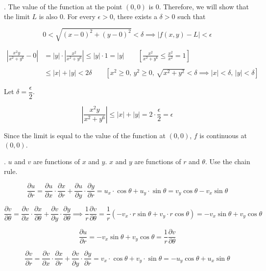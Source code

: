 \documentclass{article}
\begin{document}
\hfill

. The value of the function at the point $(0,0)$ is $0$. Therefore, we will show that the limit $L$ is also $0$. For every $\epsilon>0$, there exists a $\delta>0$ such that

\[0<\sqrt{(x-0)^2+(y-0)^2}<\delta\implies\left|f(x,y)-L\right|<\epsilon\]

\begin{align*}\left|\frac{x^2y}{x^2+y^6}-0\right|&=|y|\cdot\left|\frac{x^2}{x^2+y^6}\right|\leq|y|\cdot1=|y|\qquad\left[\frac{x^2}{x^2+y^6}\leq\frac{x^2}{x^2}=1\right]\\\\&\leq|x|+|y|<2\delta\qquad\left[x^2\geq0,\,y^2\geq0,\,\sqrt{x^2+y^2}<\delta\implies|x|<\delta,\,|y|<\delta\right]\end{align*}

\hfill

\noindent Let $\delta=\dfrac\epsilon2$.

\[\left|\frac{x^2y}{x^2+y^6}\right|\leq|x|+|y|=2\cdot\frac\epsilon2=\epsilon\]

\hfill

\noindent Since the limit is equal to the value of the function at $(0,0)$, $f$ is continuous at $(0,0)$.

\hfill

. $u$ and $v$ are functions of $x$ and $y$. $x$ and $y$ are functions of $r$ and $\theta$. Use the chain rule.

\[\frac{\partial u}{\partial r}=\frac{\partial u}{\partial x}\cdot\frac{\partial x}{\partial r}+\frac{\partial u}{\partial y}\cdot\frac{\partial y}{\partial r}=u_x\cdot\cos\theta+u_y\cdot\sin\theta=v_y\cos\theta-v_x\sin\theta\]

\[\frac{\partial v}{\partial\theta}=\frac{\partial v}{\partial x}\cdot\frac{\partial x}{\partial\theta}+\frac{\partial v}{\partial y}\cdot\frac{\partial y}{\partial\theta}\implies\frac1r\frac{\partial v}{\partial\theta}=\frac1r\left(-v_x\cdot r\sin\theta+v_y\cdot r\cos\theta\right)=-v_x\sin\theta+v_y\cos\theta\]

\[\frac{\partial u}{\partial r}=-v_x\sin\theta+v_y\cos\theta=\frac1r\frac{\partial v}{\partial\theta}\]

\hfill

\[\frac{\partial v}{\partial r}=\frac{\partial v}{\partial x}\cdot\frac{\partial x}{\partial r}+\frac{\partial v}{\partial y}\cdot\frac{\partial y}{\partial r}=v_x\cdot\cos\theta+v_y\cdot\sin\theta=-u_y\cos\theta+u_x\sin\theta\]
\end{document}
